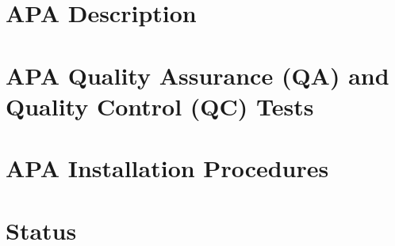 \section{APA Description}
\section{APA Quality Assurance (QA) and Quality Control (QC) Tests}
\section{APA Installation Procedures}
\section{Status}
